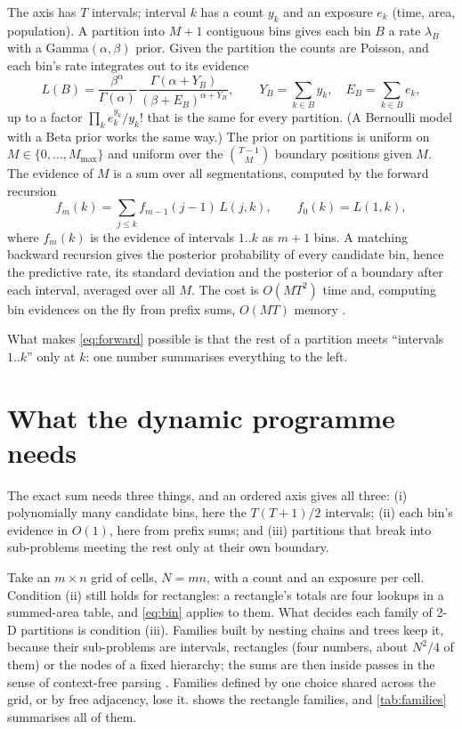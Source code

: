 \documentclass[11pt,a4paper]{article}
\begin{document}
The axis has $T$ intervals; interval $k$ has a count $y_k$ and an exposure $e_k$ (time, area,
population). A partition into $M+1$ contiguous bins gives each bin $B$ a rate $\lambda_B$ with a
Gamma$(\alpha, \beta)$ prior. Given the partition the counts are Poisson, and each bin's rate
integrates out to its evidence
\begin{equation}
  L(B) = \frac{\beta^\alpha}{\Gamma(\alpha)}\,
         \frac{\Gamma(\alpha + Y_B)}{(\beta + E_B)^{\alpha + Y_B}},
  \qquad Y_B = \sum_{k \in B} y_k,\quad E_B = \sum_{k \in B} e_k,
  \label{eq:bin}
\end{equation}
up to a factor $\prod_k e_k^{y_k} / y_k!$ that is the same for every partition. (A Bernoulli
model with a Beta prior works the same way.) The prior on partitions is uniform on $M \in
\{0, \dots, M_{\max}\}$ and uniform over the $\binom{T-1}{M}$ boundary positions given $M$. The
evidence of $M$ is a sum over all segmentations, computed by the forward recursion
\begin{equation}
  f_m(k) = \sum_{j \le k} f_{m-1}(j-1)\, L(j, k), \qquad f_0(k) = L(1, k),
  \label{eq:forward}
\end{equation}
where $f_m(k)$ is the evidence of intervals $1..k$ as $m+1$ bins. A matching backward recursion
gives the posterior probability of every candidate bin, hence the predictive rate, its standard
deviation and the posterior of a boundary after each interval, averaged over all $M$. The cost is
$O(M T^2)$ time and, computing bin evidences on the fly from prefix sums, $O(MT)$ memory
\citep{bayesbin}.

What makes \cref{eq:forward} possible is that the rest of a partition meets ``intervals $1..k$''
only at $k$: one number summarises everything to the left.

\section{What the dynamic programme needs}\label{sec:needs}

The exact sum needs three things, and an ordered axis gives all three:
(i) polynomially many candidate bins, here the $T(T+1)/2$ intervals;
(ii) each bin's evidence in $O(1)$, here from prefix sums; and
(iii) partitions that break into sub-problems meeting the rest only at their own boundary.

Take an $m \times n$ grid of cells, $N = mn$, with a count and an exposure per cell. Condition
(ii) still holds for rectangles: a rectangle's totals are four lookups in a summed-area table, and
\cref{eq:bin} applies to them. What decides each family of 2-D partitions is condition (iii).
Families built by nesting chains and trees keep it, because their sub-problems are intervals,
rectangles (four numbers, about $N^2/4$ of them) or the nodes of a fixed hierarchy; the sums are
then inside passes in the sense of context-free parsing \citep{younger1967recognition,lari1990estimation}.
Families defined by one choice shared across the grid, or by free adjacency, lose it.
 shows the rectangle families, and \cref{tab:families} summarises all of them.
\end{document}
